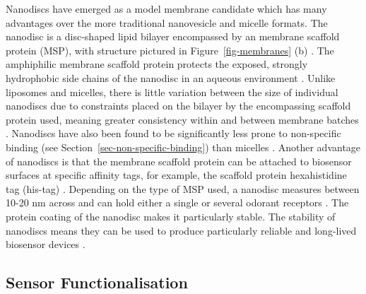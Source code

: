 \documentclass[
  a4paper,
]{scrbook}
\begin{document}
Nanodiscs have emerged as a model membrane candidate which has many
advantages over the more traditional nanovesicle and micelle formats.
The nanodisc is a disc-shaped lipid bilayer encompassed by an membrane
scaffold protein (MSP), with structure pictured in
Figure~\ref{fig-membranes} (b) \autocite{Nath2007,Bayburt2010,Yang2018}.
The amphiphilic membrane scaffold protein protects the exposed, strongly
hydrophobic side chains of the nanodisc in an aqueous environment
\autocite{Fruh2011,Yang2018}. Unlike liposomes and micelles, there is
little variation between the size of individual nanodiscs due to
constraints placed on the bilayer by the encompassing scaffold protein
used, meaning greater consistency within and between membrane batches
\autocite{Nath2007,Fruh2011}. Nanodiscs have also been found to be
significantly less prone to non-specific binding (see
Section~\ref{sec-non-specific-binding}) than micelles
\autocite{Fruh2011}. Another advantage of nanodiscs is that the membrane
scaffold protein can be attached to biosensor surfaces at specific
affinity tags, for example, the scaffold protein hexahistidine tag
(his-tag) \autocite{Bayburt2010,Fruh2011}. Depending on the type of MSP
used, a nanodisc measures between 10-20 nm across and can hold either a
single or several odorant receptors \autocite{Nath2007,Bayburt2010}. The
protein coating of the nanodisc makes it particularly stable. The
stability of nanodiscs means they can be used to produce particularly
reliable and long-lived biosensor devices
\autocite{Goldsmith2011,Yang2018,Moon2020,Cheema2021}.

\hypertarget{sec-sensor-types}{%
\subsection{Sensor Functionalisation}\label{sec-sensor-types}}
\end{document}
